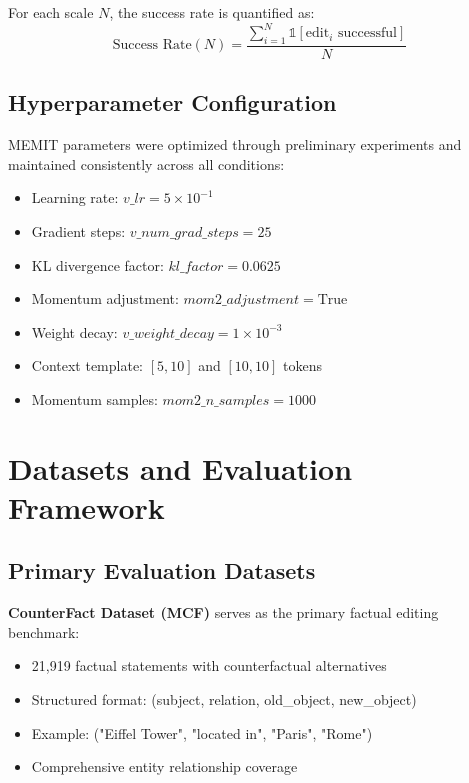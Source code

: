 For each scale $N$, the success rate is quantified as:
\begin{equation}
\text{Success Rate}(N) = \frac{\sum_{i=1}^{N} \mathbb{1}[\text{edit}_i \text{ successful}]}{N}
\end{equation}

\subsection{Hyperparameter Configuration}

MEMIT parameters were optimized through preliminary experiments and maintained consistently across all conditions:

\begin{itemize}
    \item Learning rate: $v\_lr = 5 \times 10^{-1}$
    \item Gradient steps: $v\_num\_grad\_steps = 25$
    \item KL divergence factor: $kl\_factor = 0.0625$
    \item Momentum adjustment: $mom2\_adjustment = \text{True}$
    \item Weight decay: $v\_weight\_decay = 1 \times 10^{-3}$
    \item Context template: $[5, 10]$ and $[10, 10]$ tokens
    \item Momentum samples: $mom2\_n\_samples = 1000$
\end{itemize}

\section{Datasets and Evaluation Framework}

\subsection{Primary Evaluation Datasets}

\textbf{CounterFact Dataset (MCF)} serves as the primary factual editing benchmark:
\begin{itemize}
    \item 21,919 factual statements with counterfactual alternatives
    \item Structured format: (subject, relation, old\_object, new\_object)
    \item Example: ("Eiffel Tower", "located in", "Paris", "Rome")
    \item Comprehensive entity relationship coverage
\end{itemize}

